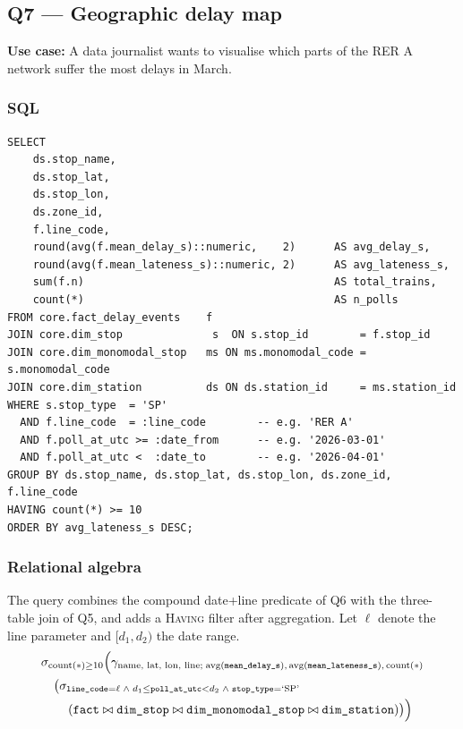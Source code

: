 \documentclass[a4paper,11pt]{article}
\begin{document}
\subsection{Q7 --- Geographic delay map}

\textbf{Use case:} A data journalist wants to visualise which parts of
the RER A network suffer the most delays in March.

\subsubsection{SQL}

\begin{lstlisting}[style=sql, caption={Q7 --- geographic delay map
  (\texttt{sql/queries/q7\_geographic\_delay\_map.sql}).}]
SELECT
    ds.stop_name,
    ds.stop_lat,
    ds.stop_lon,
    ds.zone_id,
    f.line_code,
    round(avg(f.mean_delay_s)::numeric,    2)      AS avg_delay_s,
    round(avg(f.mean_lateness_s)::numeric, 2)      AS avg_lateness_s,
    sum(f.n)                                       AS total_trains,
    count(*)                                       AS n_polls
FROM core.fact_delay_events    f
JOIN core.dim_stop              s  ON s.stop_id        = f.stop_id
JOIN core.dim_monomodal_stop   ms ON ms.monomodal_code = s.monomodal_code
JOIN core.dim_station          ds ON ds.station_id     = ms.station_id
WHERE s.stop_type  = 'SP'
  AND f.line_code  = :line_code        -- e.g. 'RER A'
  AND f.poll_at_utc >= :date_from      -- e.g. '2026-03-01'
  AND f.poll_at_utc <  :date_to        -- e.g. '2026-04-01'
GROUP BY ds.stop_name, ds.stop_lat, ds.stop_lon, ds.zone_id, f.line_code
HAVING count(*) >= 10
ORDER BY avg_lateness_s DESC;
\end{lstlisting}

\subsubsection{Relational algebra}

The query combines the compound date+line predicate of Q6 with the
three-table join of Q5, and adds a \textsc{Having} filter after
aggregation. Let $\ell$ denote the line parameter and $[d_1, d_2)$ the date range.
\begin{align*}
  &\sigma_{\text{count}(*) \geq 10}
  \Bigl(
    \gamma_{\text{name, lat, lon, line};\;
      \text{avg}(\texttt{mean\_delay\_s}),\,\text{avg}(\texttt{mean\_lateness\_s}),\,\text{count}(*)} \\
  &\quad\bigl(
    \sigma_{\texttt{line\_code}=\ell \;\land\;
            d_1 \leq \texttt{poll\_at\_utc} < d_2 \;\land\;
            \texttt{stop\_type}=\text{`SP'}} \\
  &\qquad\left(
    \texttt{fact} \bowtie \texttt{dim\_stop} \bowtie
    \texttt{dim\_monomodal\_stop} \bowtie \texttt{dim\_station}
  \right)
  \bigr)
  \Bigr)
\end{align*}
\end{document}
